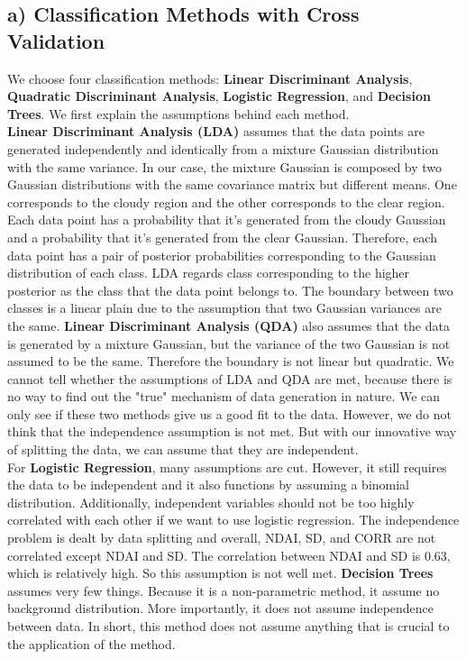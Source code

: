\documentclass[jou]{apa}%
\begin{document}
\subsection{a) Classification Methods with Cross Validation}
We choose four classification methods: \textbf{Linear Discriminant Analysis}, \textbf{Quadratic Discriminant Analysis}, \textbf{Logistic Regression}, and \textbf{Decision Trees}. We first explain the assumptions behind each method.\\
\indent \textbf{Linear Discriminant Analysis (LDA)} assumes that the data points are generated independently and identically from a mixture Gaussian distribution with the same variance. In our case, the mixture Gaussian is composed by two Gaussian distributions with the same covariance matrix but different means. One corresponds to the cloudy region and the other corresponds to the clear region. Each data point has a probability that it's generated from the cloudy Gaussian and a probability that it's generated from the clear Gaussian. Therefore, each data point has a pair of posterior probabilities corresponding to the Gaussian distribution of each class. LDA regards class corresponding to the higher posterior as the class that the data point belongs to. The boundary between two classes is a linear plain due to the assumption that two Gaussian variances are the same. \textbf{Linear Discriminant Analysis (QDA)} also assumes that the data is generated by a mixture Gaussian, but the variance of the two Gaussian is not assumed to be the same. Therefore the boundary is not linear but quadratic. We cannot tell whether the assumptions of LDA and QDA are met, because there is no way to find out the "true" mechanism of data generation in nature. We can only see if these two methods give us a good fit to the data. However, we do not think that the independence assumption is not met. But with our innovative way of splitting the data, we can assume that they are independent.\\
\indent For \textbf{Logistic Regression}, many assumptions are cut. However, it still requires the data to be independent and it also functions by assuming a binomial distribution. Additionally, independent variables should not be too highly correlated with each other if we want to use logistic regression. The independence problem is dealt by data splitting and overall, NDAI, SD, and CORR are not correlated except NDAI and SD. The correlation between NDAI and SD is 0.63, which is relatively high. So this assumption is not well met. \textbf{Decision Trees} assumes very few things. Because it is a non-parametric method, it assume no background distribution. More importantly, it does not assume independence between data. In short, this method does not assume anything that is crucial to the application of the method.\\
\end{document}
